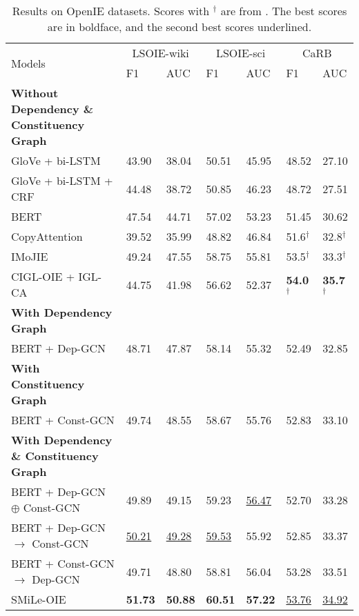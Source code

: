 \documentclass[11pt]{article}
\newcommand{\mname}{SMiLe-OIE\xspace}
\begin{document}
\begin{table*}
\centering
\begin{tabular}{l|ll|ll|ll}
 \toprule
 \multirow{2}{*}{Models} &
 \multicolumn{2}{c|}{LSOIE-wiki} &
 \multicolumn{2}{c|}{LSOIE-sci} &
 \multicolumn{2}{c}{CaRB} \\
  & F1 & AUC & F1 & AUC & F1 & AUC\\
 \midrule
 \textbf{Without Dependency \& Constituency Graph} & & & & & &\\
  GloVe + bi-LSTM~\cite{stanovsky2018supervised} & 43.90 & 38.04       & 50.51 & 45.95        & 48.52 & 27.10\\
  GloVe + bi-LSTM + CRF & 44.48 & 38.72         & 50.85 & 46.23        & 48.72 & 27.51\\
  BERT~\cite{solawetz-larson-2021-lsoie}  & 47.54 & 44.71         & 57.02 & 53.23        & 51.45 & 30.62\\
  CopyAttention~\cite{cui2018neural} & 39.52 & 35.99 & 48.82 & 46.84 & 51.6$^\dag$ & 32.8$^\dag$ \\
  IMoJIE~\cite{kolluru2020imojie}  & 49.24 & 47.55 & 58.75 & 55.81 & 53.5$^\dag$ & 33.3$^\dag$ \\
  CIGL-OIE + IGL-CA~\cite{kolluru2020openie6} & 44.75 & 41.98 & 56.62 & 52.37 & \textbf{54.0}$^\dag$ & \textbf{35.7}$^\dag$ \\
 \midrule
 \textbf{With Dependency Graph} & & & & & &\\
 BERT + Dep-GCN & 48.71 & 47.87        & 58.14 & 55.32        & 52.49 & 32.85\\

 \midrule
 \textbf{With Constituency Graph} & & & & & &\\
 BERT + Const-GCN & 49.74 & 48.55         & 58.67 & 55.76        & 52.83 & 33.10\\
 
 \midrule
 \textbf{With Dependency \& Constituency Graph} & & & & & &\\
 BERT + Dep-GCN $\oplus$ Const-GCN & 49.89 & 49.15        & 59.23 &  \underline{56.47}        & 52.70 & 33.28\\
 BERT + Dep-GCN $\rightarrow$ Const-GCN &  \underline{50.21} &  \underline{49.28}       &  \underline{59.53} & 55.92        & 52.85 & 33.37\\
 BERT + Const-GCN $\rightarrow$ Dep-GCN & 49.71 & 48.80         & 58.81 & 56.04       & 53.28 & 33.51\\
 \mname & \textbf{51.73} & \textbf{50.88} & \textbf{60.51} & \textbf{57.22} & \underline{53.76} & \underline{34.92} \\

 \bottomrule
\end{tabular}
\caption{Results on OpenIE datasets. Scores with $^\dag$ are from \citet{kolluru2020openie6}. The best scores are in boldface, and the second best scores underlined.}

\label{tab:baseline_systems}
\end{table*}
\end{document}
